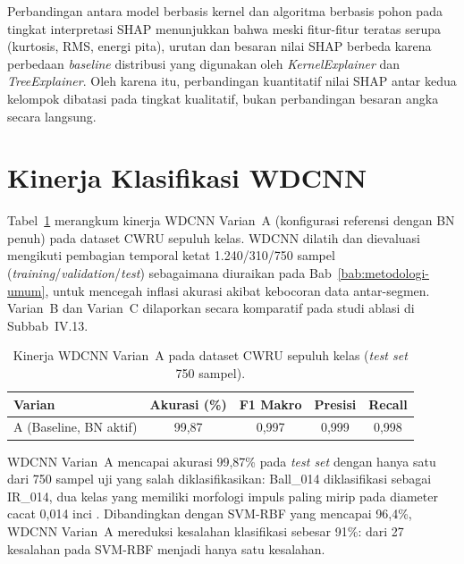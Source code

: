 Perbandingan antara model berbasis kernel dan algoritma berbasis pohon pada
tingkat interpretasi SHAP menunjukkan bahwa meski fitur-fitur teratas serupa
(kurtosis, RMS, energi pita), urutan dan besaran nilai SHAP berbeda karena
perbedaan \emph{baseline} distribusi yang digunakan oleh \emph{KernelExplainer}
dan \emph{TreeExplainer}.
Oleh karena itu, perbandingan kuantitatif nilai SHAP antar kedua kelompok
dibatasi pada tingkat kualitatif, bukan perbandingan besaran angka secara
langsung.

\section{Kinerja Klasifikasi WDCNN}
\label{sec:bab4_kinerja_wdcnn}

Tabel~\ref{tab:bab4_hasil_wdcnn} merangkum kinerja WDCNN Varian~A (konfigurasi
referensi dengan BN penuh) pada dataset CWRU sepuluh kelas.
{\color{blue}WDCNN dilatih dan dievaluasi mengikuti pembagian temporal
ketat 1.240/310/750 sampel (\emph{training}/\emph{validation}/\emph{test})
sebagaimana diuraikan pada Bab~\ref{bab:metodologi-umum}, untuk mencegah
inflasi akurasi akibat kebocoran data antar-segmen.}
Varian~B dan Varian~C dilaporkan secara komparatif pada studi ablasi di Subbab~IV.13.

\begin{table}[ht]
\caption{Kinerja WDCNN Varian~A pada dataset CWRU sepuluh kelas
         (\emph{test set} 750 sampel).}
\label{tab:bab4_hasil_wdcnn}
\centering
\begin{tabular}{lcccc}
\toprule
\textbf{Varian} & \textbf{Akurasi (\%)} & \textbf{F1 Makro} & \textbf{Presisi} & \textbf{Recall}\\
\midrule
A (Baseline, BN aktif) & 99,87 & 0,997 & 0,999 & 0,998\\
\bottomrule
\end{tabular}
\end{table}

WDCNN Varian~A mencapai akurasi 99,87\% pada \emph{test set} dengan hanya satu
dari 750 sampel uji yang salah diklasifikasikan: Ball\_014 diklasifikasi
sebagai IR\_014, dua kelas yang memiliki morfologi impuls paling mirip pada
diameter cacat 0,014 inci .
Dibandingkan dengan SVM-RBF yang mencapai 96,4\%, WDCNN Varian~A mereduksi
kesalahan klasifikasi sebesar 91\%: dari 27 kesalahan pada SVM-RBF menjadi
hanya satu kesalahan.

